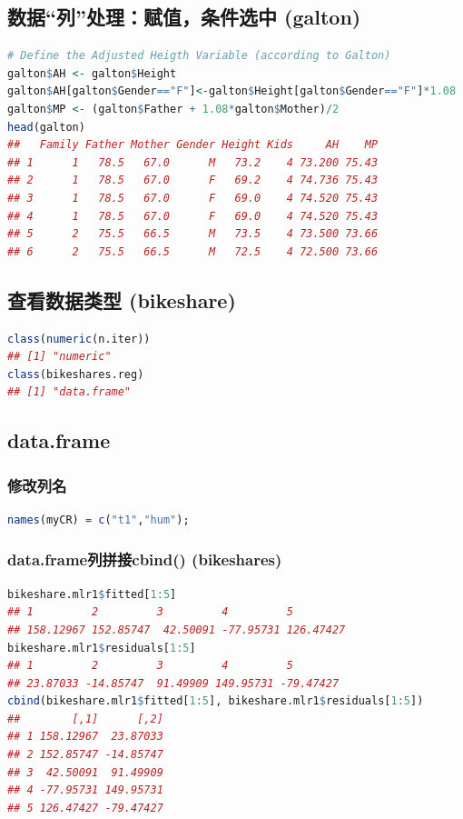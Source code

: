 \documentclass[11pt,a4paper]{article}
\begin{document}
\subsection{数据“列”处理：赋值，条件选中 (galton)}
\begin{lstlisting}[language=R]
# Define the Adjusted Heigth Variable (according to Galton)
galton$AH <- galton$Height
galton$AH[galton$Gender=="F"]<-galton$Height[galton$Gender=="F"]*1.08
galton$MP <- (galton$Father + 1.08*galton$Mother)/2
head(galton)
##   Family Father Mother Gender Height Kids     AH    MP
## 1      1   78.5   67.0      M   73.2    4 73.200 75.43
## 2      1   78.5   67.0      F   69.2    4 74.736 75.43
## 3      1   78.5   67.0      F   69.0    4 74.520 75.43
## 4      1   78.5   67.0      F   69.0    4 74.520 75.43
## 5      2   75.5   66.5      M   73.5    4 73.500 73.66
## 6      2   75.5   66.5      M   72.5    4 72.500 73.66
\end{lstlisting}

\subsection{查看数据类型 (bikeshare)}
\begin{lstlisting}[language=R]
class(numeric(n.iter))
## [1] "numeric"
class(bikeshares.reg)
## [1] "data.frame"
\end{lstlisting}


\subsection{data.frame}
\subsubsection{修改列名}
\begin{lstlisting}[language=R]
names(myCR) = c("t1","hum");
\end{lstlisting}
\subsubsection{data.frame列拼接cbind() (bikeshares)}
\begin{lstlisting}[language=R]
bikeshare.mlr1$fitted[1:5]
## 1         2         3         4         5 
## 158.12967 152.85747  42.50091 -77.95731 126.47427 
bikeshare.mlr1$residuals[1:5]
## 1         2         3         4         5 
## 23.87033 -14.85747  91.49909 149.95731 -79.47427 
cbind(bikeshare.mlr1$fitted[1:5], bikeshare.mlr1$residuals[1:5])
##        [,1]      [,2]
## 1 158.12967  23.87033
## 2 152.85747 -14.85747
## 3  42.50091  91.49909
## 4 -77.95731 149.95731
## 5 126.47427 -79.47427
\end{lstlisting}
\end{document}
